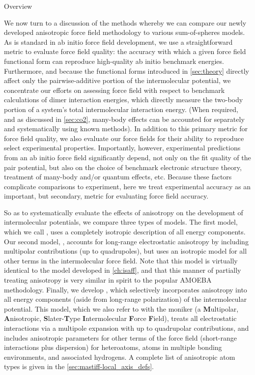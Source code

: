 
\begin{subsection}{Overview}

We now turn to a discussion of the methods whereby we can compare our newly
developed anisotropic force field methodology to various
sum-of-spheres models. 
As is standard in ab initio force field development, we use a
straightforward metric to evaluate force field quality:
the accuracy with which a given force field functional form can reproduce
high-quality ab initio benchmark energies. Furthermore, and because the
functional forms introduced in \cref{sec:theory} directly affect only the
pairwise-additive portion of the intermolecular potential, we
concentrate our efforts on assessing force field with respect to benchmark
calculations of dimer interaction energies, which directly measure the
two-body portion of a system's total intermolecular interaction energy.
(When required, and as discussed in \cref{sec:co2}, many-body effects can be accounted for separately
and systematically using known methods).\cite{Yu2012b,McDaniel2014}
%
In addition to this primary metric for force field quality, we also evaluate our force
fields for their ability to reproduce select experimental properties.
Importantly, however, 
experimental predictions from an ab initio force field significantly depend, not only on the
fit quality of the pair potential, but also on the 
choice of benchmark electronic structure theory, treatment of many-body and/or quantum
effects, etc. 
Because these factors complicate comparisons to experiment, here
we treat experimental accuracy as an important, but secondary, metric for evaluating force
field accuracy. 

So as to systematically evaluate the effects of anisotropy on the development of
intermolecular potentials, we compare three types of models.
The first model, which we call \isoff, uses a completely isotropic description
of all energy components. Our second model, \isaff, accounts for long-range electrostatic
anisotropy by including multipolar contributions (up to
quadrupoles), but uses an isotropic model for all other terms in the
intermolecular force field.
Note that this model is virtually identical to the \isaffold
model developed in \cref{ch:isaff}, and that this manner of partially
treating anisotropy is very similar in spirit to the popular AMOEBA\cite{Ren2003,Shi2013}
methodology. Finally, we develop \anisoff, which selectively incorporates anisotropy into all
energy components (aside from long-range polarization) of the intermolecular potential.
This model, which we also refer to with the moniker \mastiff (a
\textbf{M}ultipolar, \textbf{A}nisotropic, \textbf{S}later-\textbf{T}ype
\textbf{I}ntermolecular \textbf{F}orce \textbf{F}ield), treats all
electrostatic interactions via a multipole expansion with up to quadrupolar
contributions, and includes anisotropic parameters for other terms of the force field
(short-range interactions plus dispersion) for heteroatoms, atoms in
multiple bonding environments, and associated hydrogens. A complete list of anisotropic atom types is
given in the \cref{sec:mastiff-local_axis_defs}.

\end{subsection}
